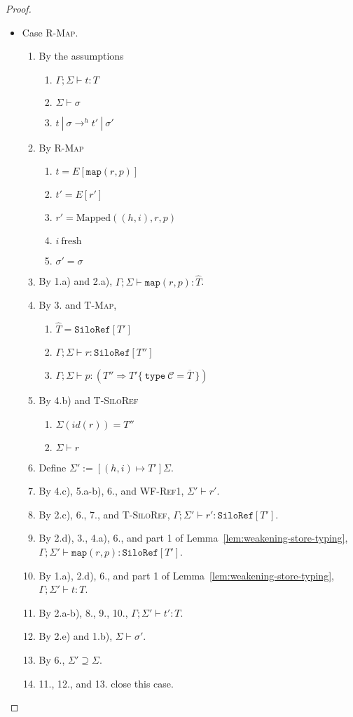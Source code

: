 \documentclass{article}
\theoremstyle{definition}
\newcommand{\seq}[1]{\overline{#1}}
\begin{document}
\begin{proof}
\begin{itemize}
\item Case \textsc{R-Map}.
\begin{enumerate}
\item By the assumptions
  \begin{enumerate}[label=(\alph*)]
  \item $\Gamma ; \Sigma \vdash t : T$
  \item $\Sigma \vdash \sigma$
  \item $t~|~\sigma \rightarrow^h t'~|~\sigma'$
  \end{enumerate}
\item By \textsc{R-Map}
  \begin{enumerate}[label=(\alph*)]
  \item $t = E[\texttt{map}(r, p)]$
  \item $t' = E[r']$
  \item $r' = \text{Mapped}((h, i), r, p)$
  \item $i~\text{fresh}$
  \item $\sigma' = \sigma$
  \end{enumerate}
\item By 1.a) and 2.a), $\Gamma ; \Sigma \vdash \texttt{map}(r, p) : \hat{T}$.
\item By 3. and \textsc{T-Map},
  \begin{enumerate}[label=(\alph*)]
  \item $\hat{T} = \texttt{SiloRef}[T']$
  \item $\Gamma ; \Sigma \vdash r : \texttt{SiloRef}[T'']$
  \item $\Gamma ; \Sigma \vdash p : (T'' \Rightarrow T' \{~\texttt{type}~\mathcal{C} = \seq{T}~\})$
  \end{enumerate}
\item By 4.b) and \textsc{T-SiloRef}
  \begin{enumerate}[label=(\alph*)]
  \item $\Sigma(id(r)) = T''$
  \item $\Sigma \vdash r$
  \end{enumerate}
\item Define $\Sigma' := [(h, i) \mapsto T']\Sigma$.
\item By 4.c), 5.a-b), 6., and \textsc{WF-Ref1}, $\Sigma' \vdash r'$.
\item By 2.c), 6., 7., and \textsc{T-SiloRef}, $\Gamma ; \Sigma' \vdash r' : \texttt{SiloRef}[T']$.
\item By 2.d), 3., 4.a), 6., and part 1 of Lemma~\ref{lem:weakening-store-typing}, $\Gamma ; \Sigma' \vdash \texttt{map}(r, p) : \texttt{SiloRef}[T']$.
\item By 1.a), 2.d), 6., and part 1 of Lemma~\ref{lem:weakening-store-typing}, $\Gamma ; \Sigma' \vdash t : T$.
\item By 2.a-b), 8., 9., 10., $\Gamma ; \Sigma' \vdash t' : T$.
\item By 2.e) and 1.b), $\Sigma \vdash \sigma'$.
\item By 6., $\Sigma' \supseteq \Sigma$.
\item 11., 12., and 13. close this case.
\end{enumerate}


\end{itemize}
\end{proof}
\end{document}
